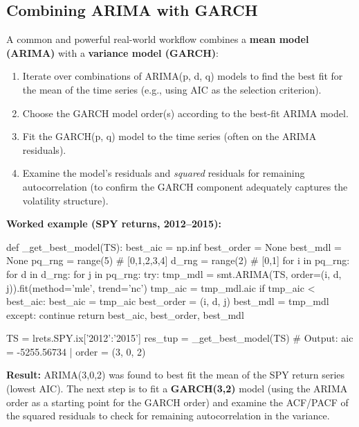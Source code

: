 \documentclass[12pt,openany]{book}
\theoremstyle{definition}
\theoremstyle{remark}
\begin{document}
\subsection{Combining ARIMA with GARCH}

A common and powerful real-world workflow combines a \textbf{mean model (ARIMA)} with a \textbf{variance model (GARCH)}:

\begin{enumerate}
\item Iterate over combinations of ARIMA(p, d, q) models to find the best fit for the mean of the time series (e.g., using AIC as the selection criterion).
\item Choose the GARCH model order(s) according to the best-fit ARIMA model.
\item Fit the GARCH(p, q) model to the time series (often on the ARIMA residuals).
\item Examine the model's residuals and \emph{squared} residuals for remaining autocorrelation (to confirm the GARCH component adequately captures the volatility structure).
\end{enumerate}

\textbf{Worked example (SPY returns, 2012–2015):}

\begin{python}
def _get_best_model(TS):
    best_aic = np.inf
    best_order = None
    best_mdl = None
    pq_rng = range(5)  # [0,1,2,3,4]
    d_rng = range(2)   # [0,1]
    for i in pq_rng:
        for d in d_rng:
            for j in pq_rng:
                try:
                    tmp_mdl = smt.ARIMA(TS, order=(i, d, j)).fit(method='mle', trend='nc')
                    tmp_aic = tmp_mdl.aic
                    if tmp_aic < best_aic:
                        best_aic = tmp_aic
                        best_order = (i, d, j)
                        best_mdl = tmp_mdl
                except:
                    continue
    return best_aic, best_order, best_mdl

TS = lrets.SPY.ix['2012':'2015']
res_tup = _get_best_model(TS)
# Output: aic = -5255.56734 | order = (3, 0, 2)
\end{python}

\textbf{Result:} ARIMA(3,0,2) was found to best fit the mean of the SPY return series (lowest AIC). The next step is to fit a \textbf{GARCH(3,2)} model (using the ARIMA order as a starting point for the GARCH order) and examine the ACF/PACF of the squared residuals to check for remaining autocorrelation in the variance.
\end{document}
